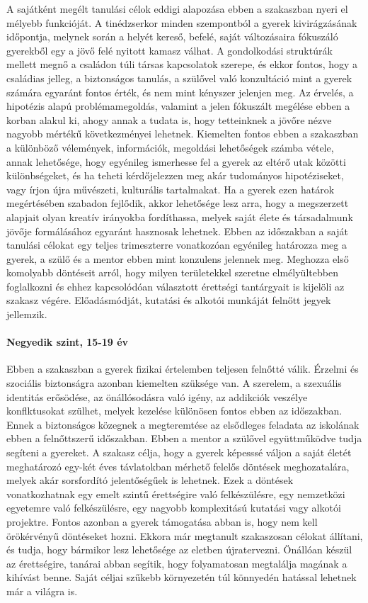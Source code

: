 A sajátként megélt tanulási célok eddigi alapozása ebben a szakaszban nyeri el
mélyebb funkcióját. A tinédzserkor minden szempontból a gyerek kivirágzásának
időpontja, melynek során a helyét kereső, befelé, saját változásaira fókuszáló
gyerekből egy a jövő felé nyitott kamasz válhat. A gondolkodási struktúrák
mellett megnő a családon túli társas kapcsolatok szerepe, és ekkor fontos, hogy
a családias jelleg, a biztonságos tanulás, a szülővel való konzultáció mint a
gyerek számára egyaránt fontos érték, és nem mint kényszer jelenjen meg.
Az érvelés, a hipotézis alapú problémamegoldás, valamint a jelen fókuszált
megélése ebben a korban alakul ki, ahogy annak a tudata is, hogy tetteinknek a
jövőre nézve nagyobb mértékű következményei lehetnek. Kiemelten fontos ebben a
szakaszban a különböző vélemények, információk, megoldási lehetőségek számba
vétele, annak lehetősége, hogy egyénileg ismerhesse fel a gyerek az eltérő utak
közötti különbségeket, és ha teheti kérdőjelezzen meg akár tudományos
hipotéziseket, vagy írjon újra művészeti, kulturális tartalmakat.
Ha a gyerek ezen határok megértésében szabadon fejlődik, akkor lehetősége lesz
arra, hogy a megszerzett alapjait olyan kreatív irányokba fordíthassa, melyek
saját élete és társadalmunk jövője formálásához egyaránt hasznosak lehetnek.
Ebben az időszakban a saját tanulási célokat egy teljes trimeszterre
vonatkozóan egyénileg határozza meg a gyerek, a szülő és a mentor ebben mint
konzulens jelennek meg. Meghozza első komolyabb döntéseit arról, hogy milyen
területekkel szeretne elmélyültebben foglalkozni és ehhez kapcsolódóan
választott érettségi tantárgyait is kijelöli az szakasz végére.
Előadásmódját, kutatási és alkotói munkáját felnőtt jegyek jellemzik.

\paragraph{Negyedik szint, 15-19 év} Ebben a szakaszban a gyerek fizikai
értelemben teljesen felnőtté válik. Érzelmi és szociális biztonságra azonban
kiemelten szüksége van. A szerelem, a szexuális identitás erősödése, az
önállósodásra való igény, az addikciók veszélye konflktusokat szülhet, melyek
kezelése különösen fontos ebben az időszakban.
Ennek a biztonságos közegnek a megteremtése az elsődleges feladata az iskolának
ebben a felnőttszerű időszakban. Ebben a mentor a szülővel együttműködve tudja
segíteni a gyereket. A szakasz célja, hogy a gyerek képesssé váljon a saját
életét	meghatározó egy-két éves távlatokban mérhető felelős döntések
meghozatalára, melyek akár sorsfordító jelentőségűek is lehetnek. Ezek a
döntések  vonatkozhatnak egy emelt szintű érettségire való felkészülésre, egy
nemzetközi egyetemre való felkészülésre, egy nagyobb komplexitású kutatási vagy
alkotói projektre. Fontos azonban a gyerek támogatása abban is, hogy nem kell
örökérvényű döntéseket hozni. Ekkora már megtanult szakaszosan célokat
állítani, és tudja, hogy bármikor lesz lehetősége az eletben újratervezni.
Önállóan készül az érettségire, tanárai abban segítik, hogy folyamatosan
megtalálja magának a kihívást benne. Saját céljai szűkebb környezetén túl
könnyedén hatással lehetnek már a világra is.